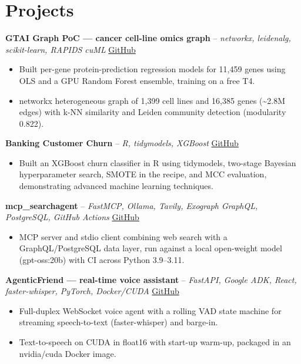 \documentclass[a4paper,11pt]{article}
\begin{document}
\section{Projects}
\noindent\textbf{GTAI Graph PoC — cancer cell-line omics graph} -- \textit{networkx, leidenalg, scikit-learn, RAPIDS cuML} \hfill \href{https://github.com/Thiruvel-AP/GTAI-GraphPOC}{GitHub}
\begin{itemize}
  \item Built per-gene protein-prediction regression models for 11,459 genes using OLS and a GPU Random Forest ensemble, training on a free T4.
  \item networkx heterogeneous graph of 1,399 cell lines and 16,385 genes (\textasciitilde{}2.8M edges) with k-NN similarity and Leiden community detection (modularity 0.822).
\end{itemize}
\vspace{3pt}
\noindent\textbf{Banking Customer Churn} -- \textit{R, tidymodels, XGBoost} \hfill \href{https://github.com/Thiruvel-AP/Banking-Customer-Churn-Prediction}{GitHub}
\begin{itemize}
  \item Built an XGBoost churn classifier in R using tidymodels, two-stage Bayesian hyperparameter search, SMOTE in the recipe, and MCC evaluation, demonstrating advanced machine learning techniques.
\end{itemize}
\vspace{3pt}
\noindent\textbf{mcp\_searchagent} -- \textit{FastMCP, Ollama, Tavily, Exograph GraphQL, PostgreSQL, GitHub Actions} \hfill \href{https://github.com/Thiruvel-AP/mcp_searchagent}{GitHub}
\begin{itemize}
  \item MCP server and stdio client combining web search with a GraphQL/PostgreSQL data layer, run against a local open-weight model (gpt-oss:20b) with CI across Python 3.9–3.11.
\end{itemize}
\vspace{3pt}
\noindent\textbf{AgenticFriend — real-time voice assistant} -- \textit{FastAPI, Google ADK, React, faster-whisper, PyTorch, Docker/CUDA} \hfill \href{https://github.com/Thiruvel-AP/adk_multi-agent}{GitHub}
\begin{itemize}
  \item Full-duplex WebSocket voice agent with a rolling VAD state machine for streaming speech-to-text (faster-whisper) and barge-in.
  \item Text-to-speech on CUDA in float16 with start-up warm-up, packaged in an nvidia/cuda Docker image.
\end{itemize}
\end{document}
